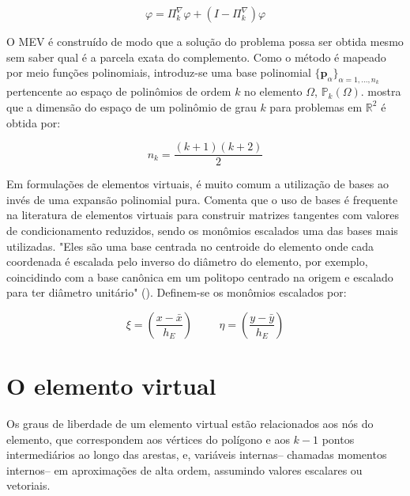     \begin{equation}
        \varphi=\Pi_k^{\nabla}\varphi+(I-\Pi_k^{\nabla})\varphi
        \label{eq:4.3}
    \end{equation}

    \indent O MEV é construído de modo que a solução do problema possa ser obtida mesmo sem saber qual é a parcela exata do complemento. Como o método é mapeado por meio funções polinomiais, introduz-se uma base polinomial $\{\mathbf{p}_\alpha\}_{\alpha = 1,...,n_k}$ pertencente ao espaço de polinômios de ordem $k$ no elemento $\Omega$, $\mathbb{P}_{k}(\Omega)$. \citet{vem2017virtual} mostra que a dimensão do espaço de um polinômio de grau $k$ para problemas em $\mathbb{R}^2$ é obtida por: 

    \begin{equation}
        n_k = \frac{(k+1)(k+2)}{2}
        \label{eq:4.4}
    \end{equation}

    \indent Em formulações de elementos virtuais, é muito comum a utilização de bases ao invés de uma expansão polinomial pura. \citet{wriggers2024virtual} Comenta que o uso de bases é frequente na literatura de elementos virtuais para construir matrizes tangentes com valores de condicionamento reduzidos, sendo os monômios escalados uma das bases mais utilizadas. "Eles são uma base centrada no centroide do elemento onde cada coordenada é escalada pelo inverso do diâmetro do elemento, por exemplo, coincidindo com a base canônica em um politopo centrado na origem e escalado para ter diâmetro unitário" (\citet{virtualelementmethodoverviewformulations2024a}). Definem-se os monômios escalados por: 

    \begin{equation}
        \xi = \left( \frac{x - \bar{x}}{h_E} \right) \hspace{1cm} \eta = \left( \frac{y - \bar{y}}{h_E} \right)
        \label{eq:4.5}
    \end{equation}

\section{O elemento virtual}
	
    \indent Os graus de liberdade de um elemento virtual estão relacionados aos nós do elemento, que correspondem aos vértices do polígono e aos $k-1$ pontos intermediários ao longo das arestas, e, variáveis internas-- chamadas momentos internos-- em aproximações de alta ordem, assumindo valores escalares ou vetoriais. 

